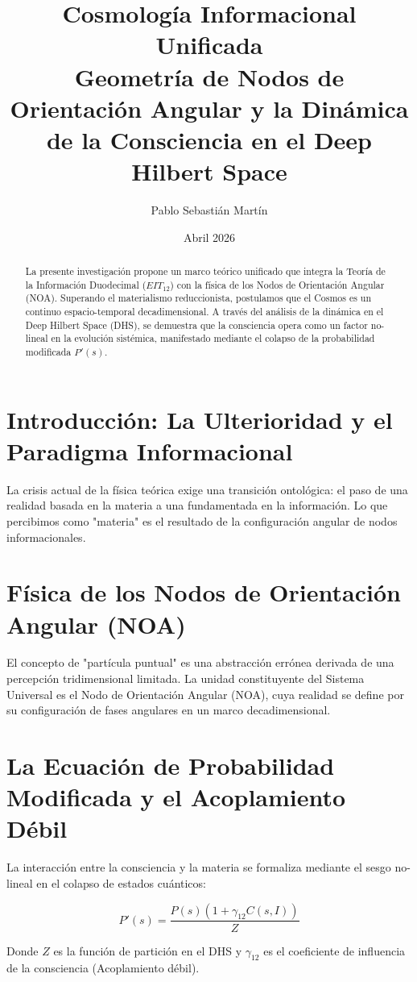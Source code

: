 \documentclass[12pt,a4paper]{article}
\title{\textbf{Cosmología Informacional Unificada}\\ \large Geometría de Nodos de Orientación Angular y la Dinámica de la Consciencia en el Deep Hilbert Space}
\author{Pablo Sebastián Martín}
\date{Abril 2026}
\begin{document}
\maketitle

\begin{abstract}
La presente investigación propone un marco teórico unificado que integra la Teoría de la Información Duodecimal ($EIT_{12}$) con la física de los Nodos de Orientación Angular (NOA). Superando el materialismo reduccionista, postulamos que el Cosmos es un continuo espacio-temporal decadimensional. A través del análisis de la dinámica en el Deep Hilbert Space (DHS), se demuestra que la consciencia opera como un factor no-lineal en la evolución sistémica, manifestado mediante el colapso de la probabilidad modificada $P'(s)$.
\end{abstract}

\section{Introducción: La Ulterioridad y el Paradigma Informacional}
La crisis actual de la física teórica exige una transición ontológica: el paso de una realidad basada en la materia a una fundamentada en la información. Lo que percibimos como "materia" es el resultado de la configuración angular de nodos informacionales.

\section{Física de los Nodos de Orientación Angular (NOA)}
El concepto de "partícula puntual" es una abstracción errónea derivada de una percepción tridimensional limitada. La unidad constituyente del Sistema Universal es el Nodo de Orientación Angular (NOA), cuya realidad se define por su configuración de fases angulares en un marco decadimensional.

\section{La Ecuación de Probabilidad Modificada y el Acoplamiento Débil}
La interacción entre la consciencia y la materia se formaliza mediante el sesgo no-lineal en el colapso de estados cuánticos:

\begin{equation}
P'(s) = \frac{P(s)(1 + \gamma_{12} C(s, I))}{Z}
\end{equation}

Donde $Z$ es la función de partición en el DHS y $\gamma_{12}$ es el coeficiente de influencia de la consciencia (Acoplamiento débil).
\end{document}
